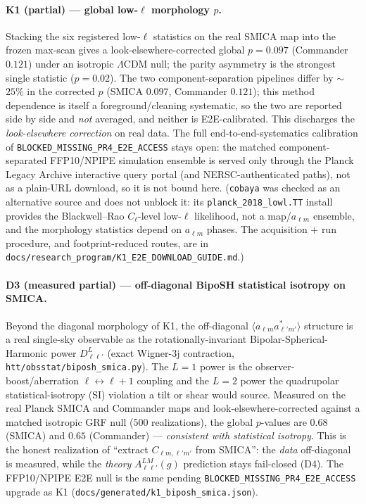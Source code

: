 \documentclass[11pt,a4paper]{article}
\theoremstyle{plain}
\theoremstyle{definition}
\begin{document}
\paragraph{K1 (partial) --- global low-$\ell$ morphology $p$.}
Stacking the six registered low-$\ell$ statistics on the real SMICA map into the
frozen max-scan gives a look-elsewhere-corrected global $p=0.097$ (Commander
$0.121$) under an isotropic $\Lambda$CDM null; the parity asymmetry is the
strongest single statistic ($p=0.02$). The two component-separation pipelines
differ by $\sim$$25\%$ in the corrected $p$ (SMICA $0.097$, Commander $0.121$);
this method dependence is itself a foreground/cleaning systematic, so the two are
reported side by side and \emph{not} averaged, and neither is E2E-calibrated.
This discharges the \emph{look-elsewhere correction} on real data. The full
end-to-end-systematics calibration of
\texttt{BLOCKED\_MISSING\_PR4\_E2E\_ACCESS} stays open: the matched
component-separated FFP10/NPIPE simulation ensemble is served only through the
Planck Legacy Archive interactive query portal (and NERSC-authenticated paths),
not as a plain-URL download, so it is not bound here. (\texttt{cobaya} was checked
as an alternative source and does not unblock it: its \texttt{planck\_2018\_lowl.TT}
install provides the Blackwell--Rao $C_\ell$-level low-$\ell$ likelihood, not a
map/$a_{\ell m}$ ensemble, and the morphology statistics depend on $a_{\ell m}$
phases. The acquisition + run procedure, and footprint-reduced routes, are in
\texttt{docs/research\_program/K1\_E2E\_DOWNLOAD\_GUIDE.md}.)

\paragraph{D3 (measured partial) --- off-diagonal BipoSH statistical isotropy on SMICA.}
Beyond the diagonal morphology of K1, the off-diagonal
$\langle a_{\ell m}a^{*}_{\ell'm'}\rangle$ structure is a real single-sky
observable as the rotationally-invariant Bipolar-Spherical-Harmonic power
$D^{L}_{\ell\ell'}$ (exact Wigner-3j contraction,
\texttt{htt/obsstat/biposh\_smica.py}). The $L{=}1$ power is the
observer-boost/aberration $\ell\!\leftrightarrow\!\ell{+}1$ coupling and the
$L{=}2$ power the quadrupolar statistical-isotropy (SI) violation a tilt or shear
would source. Measured on the real Planck SMICA and Commander maps and
look-elsewhere-corrected against a matched isotropic GRF null ($500$
realizations), the global $p$-values are $0.68$ (SMICA) and $0.65$ (Commander) ---
\emph{consistent with statistical isotropy}. This is the honest realization of
``extract $C_{\ell m,\ell'm'}$ from SMICA'': the \emph{data} off-diagonal is
measured, while the \emph{theory} $A^{LM}_{\ell\ell'}(g)$ prediction stays
fail-closed (D4). The FFP10/NPIPE E2E null is the same pending
\texttt{BLOCKED\_MISSING\_PR4\_E2E\_ACCESS} upgrade as K1
(\texttt{docs/generated/k1\_biposh\_smica.json}).
\end{document}
